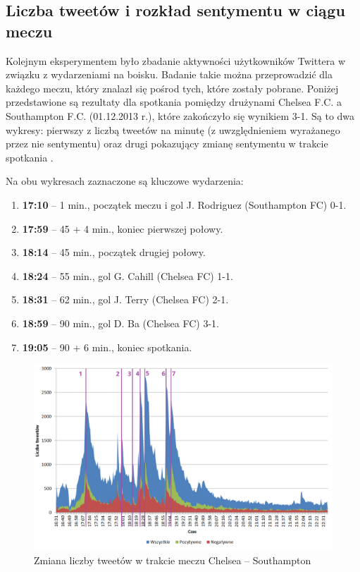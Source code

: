 \subsection{Liczba tweetów i rozkład sentymentu w ciągu meczu}
\label{subsection:aktywnoscwmeczu}
Kolejnym eksperymentem było zbadanie aktywności użytkowników Twittera w związku
z wydarzeniami na boisku. Badanie takie można przeprowadzić dla każdego meczu,
który znalazł się pośrod tych, które zostały pobrane. Poniżej przedstawione są
rezultaty dla spotkania pomiędzy drużynami Chelsea F.C. a Southampton F.C.
(01.12.2013 r.), które zakończyło się wynikiem 3-1. Są to dwa wykresy: pierwszy
z liczbą tweetów na minutę (z uwzględnieniem wyrażanego przez nie sentymentu) 
 oraz drugi pokazujący zmianę sentymentu w trakcie
spotkania .

Na obu wykresach zaznaczone są kluczowe wydarzenia:

\begin{enumerate}
  \item \textbf{17:10} -- 1 min., początek meczu i gol J. Rodriguez (Southampton FC) 0-1.
  \item \textbf{17:59} -- 45 + 4 min., koniec pierwszej połowy.
  \item \textbf{18:14} -- 45 min., początek drugiej połowy.
  \item \textbf{18:24} -- 55 min., gol G. Cahill (Chelsea FC) 1-1.
  \item \textbf{18:31} -- 62 min., gol J. Terry (Chelsea FC) 2-1.
  \item \textbf{18:59} -- 90 min., gol D. Ba (Chelsea FC) 3-1.
  \item \textbf{19:05} -- 90 + 6 min., koniec spotkania.
\end{enumerate}



\begin{figure}[ht!]
\centering
\includegraphics[width=160mm]{img/tweety-w-meczu-nums.png}
\caption{Zmiana liczby tweetów w trakcie meczu Chelsea -- Southampton}
\label{image:tweety-w-meczu}
\end{figure}

